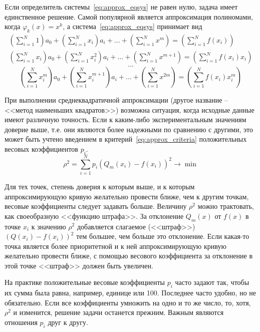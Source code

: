 Если определитель системы~\eqref{eq:approx_eqsys} не равен нулю, задача имеет единственное решение. Самой популярной
является аппроксимация полиномами, когда $\varphi_k(x) = x^k$, а система~\eqref{eq:approx_eqsys} принимает вид
\begin{gather*}
    \left( \sum_{i=1}^{N} 1 \right)a_0 + \left( \sum_{i=1}^{N} x_i \right)a_i + \dots + \left( \sum_{i=1}^{N} x^m \right) = \left( \sum_{i=1}^{N} f(x_i) \right)\\
    \left( \sum_{i=1}^{N} x_i \right)a_0 + \left( \sum_{i=1}^{N} x_i^2 \right)a_i + \dots + \left( \sum_{i=1}^{N} x^{m+1} \right) = \left( \sum_{i=1}^{N} f(x_i)x_i \right)
\end{gather*}
\begin{equation}
    \dots
\end{equation}
\begin{equation*}
    \left( \sum_{i=1}^{N} x_i^m \right)a_0 + \left( \sum_{i=1}^{N} x_i^{m+1} \right)a_i + \dots + \left( \sum_{i=1}^{N} x^{2m} \right) = \left( \sum_{i=1}^{N} f(x_i)x_i^m \right)
\end{equation*}

При выполнении среднеквадратичной аппроксимации (другое название -- <<метод наименьших квадратов>>) возможна ситуация,
когда исходные данные имеют различную точность. Если к каким-либо экспериментальным значениям доверие выше, т.е. они
являются более надежными по сравнению с другими, это может быть учтено введением в критерий~\eqref{eq:approx_criteria}
положительных весовых коэффициентов $p_i$.
\begin{equation}
    \rho^2 = \sum_{i=1}^{N} p_i \left( Q_m(x_i) - f(x_i) \right)^2 \rightarrow \min \label{eq:approx_with_p}
\end{equation}

Для тех точек, степень доверия к которым выше, и к которым аппроксимирующую кривую желательно провести ближе, чем к
другим точкам, весовые коэффициенты следует задавать больше. Величину $\rho^2$ можно трактовать, как своеобразную <<функцию
штрафа>>. За отклонение $Q_m(x)$ от $f(x)$ в точке $x_i$ к значению $\rho^2$ добавляется слагаемое (<<штраф>>)
$\left( Q(x_i) - f(x_i) \right)^2$ тем большее, чем больше это отклонение. Если какая-то точка является более
приоритетной и к ней аппроксимирующую кривую желательно провести ближе, с помощью весового коэффициента за отклонение в
этой точке <<штраф>> должен быть увеличен.

На практике положительные весовые коэффициенты $p_i$ часто задают так, чтобы их сумма была равна, например, единице или
100. Последнее часто удобно, но не обязательно. Если все коэффициенты умножить на одно и то же число, то, хотя, $\rho^2$ и
изменится, решение задачи останется прежним. Важным являются отношения $p_i$ друг к другу.
